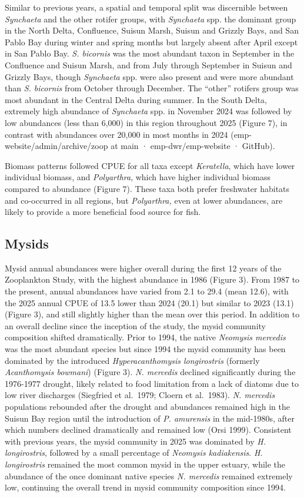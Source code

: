 \documentclass[
  letterpaper,
]{article}
\begin{document}
Similar to previous years, a spatial and temporal split was discernible
between \emph{Synchaeta} and the other rotifer groups, with
\emph{Synchaeta} spp. the dominant group in the North Delta, Confluence,
Suisun Marsh, Suisun and Grizzly Bays, and San Pablo Bay during winter
and spring months but largely absent after April except in San Pablo
Bay. \emph{S. bicornis} was the most abundant taxon in September in the
Confluence and Suisun Marsh, and from July through September in Suisun
and Grizzly Bays, though \emph{Synchaeta} spp. were also present and
were more abundant than \emph{S. bicornis} from October through
December. The ``other'' rotifers group was most abundant in the Central
Delta during summer. In the South Delta, extremely high abundance of
\emph{Synchaeta} spp. in November 2024 was followed by low abundances
(less than 6,000) in this region throughout 2025 (Figure 7), in contrast
with abundances over 20,000 in most months in 2024
(emp-website/admin/archive/zoop at main · emp-dwr/emp-website · GitHub).

Biomass patterns followed CPUE for all taxa except \emph{Keratella},
which have lower individual biomass, and \emph{Polyarthra}, which have
higher individual biomass compared to abundance (Figure 7). These taxa
both prefer freshwater habitats and co-occurred in all regions, but
\emph{Polyarthra,} even at lower abundances, are likely to provide a
more beneficial food source for fish.

\subsection{Mysids}\label{mysids}

Mysid annual abundances were higher overall during the first 12 years of
the Zooplankton Study, with the highest abundance in 1986 (Figure 3).
From 1987 to the present, annual abundances have varied from 2.1 to 29.4
(mean 12.6), with the 2025 annual CPUE of 13.5 lower than 2024 (20.1)
but similar to 2023 (13.1) (Figure 3), and still slightly higher than
the mean over this period. In addition to an overall decline since the
inception of the study, the mysid community composition shifted
dramatically. Prior to 1994, the native \emph{Neomysis mercedis} was the
most abundant species but since 1994 the mysid community has been
dominated by the introduced \emph{Hyperacanthomysis longirostris}
(formerly \emph{Acanthomysis bowmani}) (Figure 3). \emph{N. mercedis}
declined significantly during the 1976-1977 drought, likely related to
food limitation from a lack of diatoms due to low river discharges
(Siegfried et al.~1979; Cloern et al.~1983). \emph{N. mercedis}
populations rebounded after the drought and abundances remained high in
the Suisun Bay region until the introduction of \emph{P. amurensis} in
the mid-1980s, after which numbers declined dramatically and remained
low (Orsi 1999). Consistent with previous years, the mysid community in
2025 was dominated by \emph{H. longirostris}, followed by a small
percentage of \emph{Neomysis kadiakensis}. \emph{H. longirostris}
remained the most common mysid in the upper estuary, while the abundance
of the once dominant native species \emph{N. mercedis} remained
extremely low, continuing the overall trend in mysid community
composition since 1994.
\end{document}
